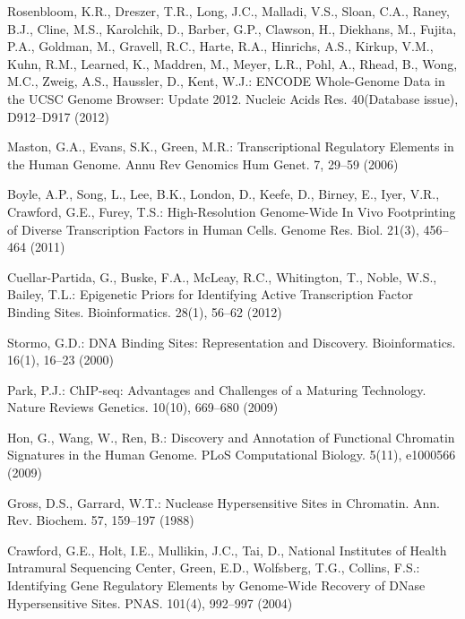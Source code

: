 \documentclass[runningheads,a4paper]{llncs}
\begin{document}
\begin{thebibliography}{4}

 Rosenbloom, K.R., Dreszer, T.R., Long, J.C., Malladi, V.S., Sloan, C.A., Raney, B.J., Cline, M.S., Karolchik, D., Barber, G.P., Clawson, H., Diekhans, M., Fujita, P.A., Goldman, M., Gravell, R.C., Harte, R.A., Hinrichs, A.S., Kirkup, V.M., Kuhn, R.M., Learned, K., Maddren, M., Meyer, L.R., Pohl, A., Rhead, B., Wong, M.C., Zweig, A.S., Haussler, D., Kent, W.J.: ENCODE Whole-Genome Data in the UCSC Genome Browser: Update 2012. Nucleic Acids Res. 40(Database issue), D912--D917 (2012)

 Maston, G.A., Evans, S.K., Green, M.R.: Transcriptional Regulatory Elements in the Human Genome. Annu Rev Genomics Hum Genet. 7, 29--59 (2006)

 Boyle, A.P., Song, L., Lee, B.K., London, D., Keefe, D., Birney, E., Iyer, V.R., Crawford, G.E., Furey, T.S.: High-Resolution Genome-Wide In Vivo Footprinting of Diverse Transcription Factors in Human Cells. 
Genome Res. Biol. 21(3), 456--464 (2011)

 Cuellar-Partida, G., Buske, F.A., McLeay, R.C., Whitington, T., Noble, W.S., Bailey, T.L.: Epigenetic Priors for Identifying Active Transcription Factor Binding Sites. Bioinformatics. 28(1), 56--62 (2012)

 Stormo, G.D.: DNA Binding Sites: Representation and Discovery. Bioinformatics. 16(1), 16--23 (2000)

 Park, P.J.: ChIP-seq: Advantages and Challenges of a Maturing Technology. Nature Reviews Genetics. 10(10), 669--680 (2009)

 Hon, G., Wang, W., Ren, B.: Discovery and Annotation of Functional Chromatin Signatures in the Human Genome. PLoS Computational Biology. 5(11), e1000566 (2009)

 Gross, D.S., Garrard, W.T.: Nuclease Hypersensitive Sites in Chromatin. Ann. Rev. Biochem. 57, 159--197 (1988)

 Crawford, G.E., Holt, I.E., Mullikin, J.C., Tai, D., National Institutes of Health Intramural Sequencing Center, Green, E.D., Wolfsberg, T.G., Collins, F.S.: Identifying Gene Regulatory Elements by
Genome-Wide Recovery of DNase Hypersensitive Sites. PNAS. 101(4), 992--997 (2004)


\end{thebibliography}
\end{document}
